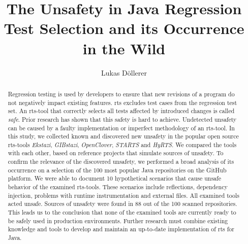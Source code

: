 \documentclass[runningheads]{llncs}
\begin{document}
%
\title{The Unsafety in Java Regression Test Selection and its Occurrence in the Wild}
%
%
%
\author{Lukas Döllerer}
%
\maketitle %
%
%
\begin{abstract}
  Regression testing is used by developers to ensure that new
  revisions of a program do not negatively impact existing features.
  \ac{rts} excludes test cases from the regression test set. An \ac{rts}-tool that correctly
  selects all tests affected by introduced changes is
  called \emph{safe}. Prior research has shown that this safety is hard to achieve.
  Undetected unsafety can be caused by a faulty implementation or imperfect
  methodology of an \ac{rts}-tool. In this study, we collected known and discovered new unsafety
  in the popular open source \ac{rts}-tools \emph{Ekstazi}, \emph{GIBstazi}, \emph{OpenClover}, \emph{STARTS} and \emph{HyRTS}.
  We compared the tools with each other, based on reference projects that simulate sources of unsafety.
  To confirm the relevance of the discovered unsafety, we performed a broad analysis of its occurrence on a
  selection of the 100 most popular Java
  repositories on the GitHub platform. We were able to document 10 hypothetical scenarios that cause unsafe
  behavior of the examined \ac{rts}-tools. These scenarios include reflections, dependency injection, problems with runtime instrumentation
  and external files. All examined tools acted unsafe. Sources of unsafety were
  found in 88 out of the 100 scanned repositories. This leads us to the conclusion that none of the
  examined tools are currently ready to be safely used in production environments. Further research must combine
  existing knowledge and tools to develop and maintain an up-to-date implementation of \ac{rts} for Java.
\end{abstract}
%
%







%
%
\appendix

%
%
\clearpage


%
\clearpage
\vspace*{\fill}
\doclicenseThis
\end{document}
